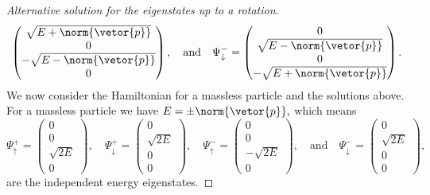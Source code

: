 \begin{proof}[Alternative solution for the eigenstates up to a rotation]
\begin{equation*}
\begin{pmatrix}
         \sqrt{E + \norm{\vetor{p}}}\\
         0\\
         -\sqrt{E - \norm{\vetor{p}}}\\
         0
      \end{pmatrix},\quad\text{and}\quad
      \Psi^-_\downarrow = \begin{pmatrix}
         0\\
         \sqrt{E - \norm{\vetor{p}}}\\
         0\\
         -\sqrt{E + \norm{\vetor{p}}}
      \end{pmatrix}.
   \end{equation*}
   We now consider the Hamiltonian for a massless particle and the solutions above. For a massless particle we have \(E = \pm \norm{\vetor{p}},\) which means
   \begin{equation*}
      \Psi^+_\uparrow = \begin{pmatrix}
         0\\
         0\\
         \sqrt{2E}\\
         0
      \end{pmatrix},\quad
      \Psi^+_\downarrow = \begin{pmatrix}
         0\\
         \sqrt{2E}\\
         0\\
         0
      \end{pmatrix},\quad
      \Psi^-_\uparrow = \begin{pmatrix}
         0\\
         0\\
         -\sqrt{2E}\\
         0
      \end{pmatrix},\quad\text{and}\quad
      \Psi^-_\downarrow = \begin{pmatrix}
         0\\
         \sqrt{2E}\\
         0\\
         0
      \end{pmatrix},
   \end{equation*}
   are the independent energy eigenstates.
\end{proof}

